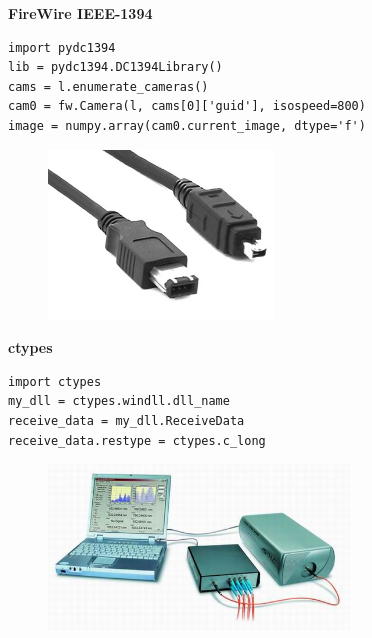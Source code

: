 \documentclass{beamer}
\begin{document}
\begin{frame}[fragile]

\textbf{FireWire IEEE-1394}

\begin{verbatim}
import pydc1394
lib = pydc1394.DC1394Library()
cams = l.enumerate_cameras()
cam0 = fw.Camera(l, cams[0]['guid'], isospeed=800)
image = numpy.array(cam0.current_image, dtype='f')
\end{verbatim}

\begin{figure}[ht]
	\includegraphics[width=6cm]{firewire.jpg}
\end{figure}

\end{frame}

\begin{frame}[fragile]

\textbf{ctypes}

\begin{verbatim}
import ctypes
my_dll = ctypes.windll.dll_name
receive_data = my_dll.ReceiveData
receive_data.restype = ctypes.c_long
\end{verbatim}

\begin{figure}[ht]
	\includegraphics[width=8cm]{wlm.jpg}
\end{figure}

\end{frame}
\end{document}
